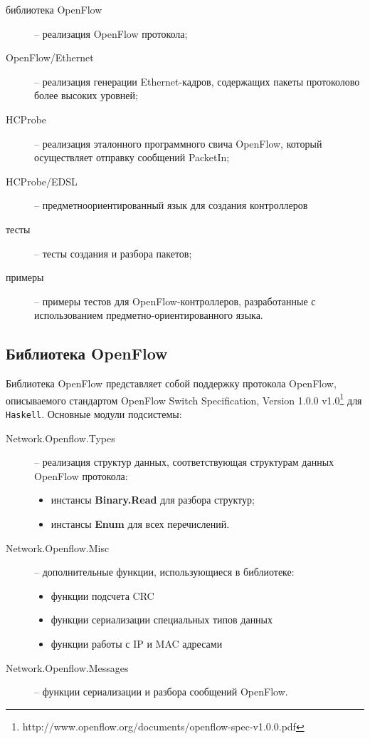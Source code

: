\documentclass[9pt,a4paper]{article}
\begin{document}
\begin{description}
    \item[библиотека OpenFlow] -- реализация OpenFlow протокола;
    \item[OpenFlow/Ethernet]   -- реализация генерации Ethernet-кадров, содержащих пакеты протоколово более высоких уровней;
    \item[HCProbe]             -- реализация эталонного программного свича OpenFlow, который осуществляет отправку сообщений PacketIn;
    \item[HCProbe/EDSL]        -- предметноориентированный язык для создания контроллеров
    \item[тесты]               -- тесты создания и разбора пакетов;
    \item[примеры]             -- примеры тестов для OpenFlow-контроллеров, разработанные с использованием предметно-ориентированного языка.
\end{description}


\subsection{Библиотека OpenFlow}

Библиотека OpenFlow представляет собой поддержку протокола 
OpenFlow, описываемого стандартом OpenFlow Switch Specification, Version 1.0.0
v1.0\footnote{http://www.openflow.org/documents/openflow-spec-v1.0.0.pdf}
для \texttt{Haskell}. Основные модули подсистемы:

\begin{description}
    \item[Network.Openflow.Types] -- реализация структур данных, соответствующая
        структурам данных OpenFlow протокола:
        \begin{itemize}
            \item инстансы \textbf{Binary.Read} для разбора структур;
            \item инстансы \textbf{Enum} для всех перечислений.
        \end{itemize}
    \item[Network.Openflow.Misc] -- дополнительные функции, использующиеся в библиотеке:
        \begin{itemize}
            \item функции подсчета CRC
            \item функции сериализации специальных типов данных
            \item функции работы с IP и MAC адресами
        \end{itemize}
    \item[Network.Openflow.Messages] -- функции сериализации и разбора сообщений OpenFlow.
\end{description}
\end{document}
